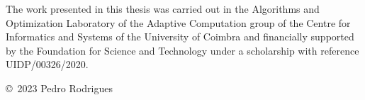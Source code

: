 \begin{funding}
  The work presented in this thesis was carried out in the Algorithms and
  Optimization Laboratory of the Adaptive Computation group of the Centre for
  Informatics and Systems of the University of Coimbra and financially supported
  by the Foundation for Science and Technology under a scholarship with
  reference UIDP/00326/2020.

  \copyright{}~2023 Pedro Rodrigues
\end{funding}